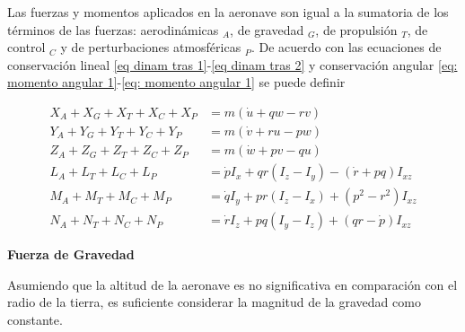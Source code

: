 Las fuerzas y momentos aplicados en la aeronave son igual a la sumatoria de los términos de las fuerzas: aerodinámicas $_A$, de gravedad  $_G$, de propulsión  $_T$, de control  $_C$ y de perturbaciones atmosféricas $_P$. 
De acuerdo con las ecuaciones de conservación lineal \ref{eq dinam tras 1}-\ref{eq dinam tras 2} y conservación angular \ref{eq: momento angular 1}-\ref{eq: momento angular 1} se puede definir



\begin{align}
    X_{A} + X_{G} + X_{T} + X_{C} + X_{P} &= m (\dot u + qw - rv) \\
    Y_{A} + Y_{G} + Y_{T} + Y_{C} + Y_{P} &= m (\dot v + ru - pw) \\
    Z_{A} + Z_{G} + Z_{T} + Z_{C} + Z_{P} &= m (\dot w + pv - qu) \\
    L_{A} + L_{T} + L_{C} + L_{P} &= \dot p I_{x} + qr(I_{z} - I_{y}) - (\dot r + pq)I_{xz} \\
    M_{A} + M_{T} + M_{C} + M_{P}  &= \dot q I_{y} + pr(I_{z} - I_{x}) + (p^2 - r^2)I_{xz} \\
    N_{A} + N_{T} + N_{C} + N_{P} &= \dot r I_{z} + pq(I_{y} - I_{z}) + (qr - \dot p)I_{xz}
\end{align}


\textbf{Fuerza de Gravedad}


Asumiendo que la altitud de la aeronave es no significativa en comparación con el radio de la tierra, es suficiente considerar la magnitud de la gravedad como constante. 

